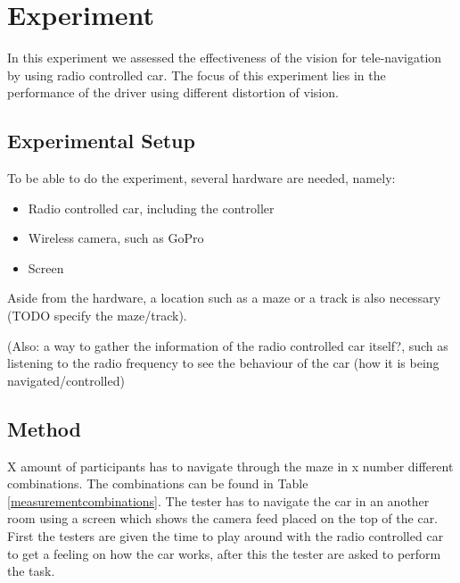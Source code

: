 \chapter{Experiment}
In this experiment we assessed the effectiveness of the vision for tele-navigation by using radio controlled car. The focus of this experiment lies in the performance of the driver using different distortion of vision. 

\section{Experimental Setup}
To be able to do the experiment, several hardware are needed, namely:

\begin{itemize}
  \item Radio controlled car, including the controller
  \item Wireless camera, such as GoPro
  \item Screen
\end{itemize}

Aside from the hardware, a location such as a maze or a track is also necessary (TODO specify the maze/track). 

(Also: a way to gather the information of the radio controlled car itself?, such as listening to the radio frequency to see the behaviour of the car (how it is being navigated/controlled)

\iffalse
- miniature radio controlled car
- environment with high(relative to car) location-cues
- Batteries
- Car controller
- Way to intercept the driving signals
- GoPro?
- wormeye view
- track / maze

\section{Remote navigation}
- screen
- head mounted display?
- FOV closure/distortion stuff
- remove center / peripheral, letterboxes
\fi

\section{Method}
X amount of participants has to navigate through the maze in x number different combinations. The combinations can be found in Table \ref{measurementcombinations}. The tester has to navigate the car in an another room using a screen which shows the camera feed placed on the top of the car. First the testers are given the time to play around with the radio controlled car to get a feeling on how the car works, after this the tester are asked to perform the task. 


